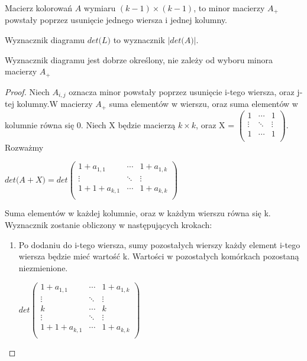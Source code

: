   \begin{definicja}
	Macierz kolorowań $A$ wymiaru $(k-1) \times (k-1)$, to minor macierzy $A_{+}$ powstały poprzez usunięcie jednego wiersza i jednej kolumny.
  \end{definicja}
    \begin{definicja}
    Wyznacznik diagramu $ det \big(L\big)$ to wyznacznik $\vert det \big(A\big) \vert$.
    \end{definicja}
    
\begin{twierdzenie}
Wyznacznik diagramu jest dobrze określony, nie zależy od wyboru minora macierzy $A_{+}$
\end{twierdzenie}

\begin{proof}
Niech $A_{i,j}$ oznacza minor powstały poprzez usunięcie i-tego wiersza, oraz j-tej kolumny.W macierzy $A_{+}$ suma elementów w wierszu, oraz suma elementów w kolumnie równa się 0. Niech X będzie macierzą $k \times k$, oraz X = 
$
\begin{pmatrix}
 1 & \cdots & 1 \\
 \vdots & \ddots & \vdots \\
 1 & \cdots & 1 \\
\end{pmatrix}
$. Rozważmy \\
\begin{center}
 $det\big( A+X \big)=det \begin{pmatrix}
 1+a_{1,1} & \cdots & 1+a_{1,k} \\
 \vdots & \ddots & \vdots \\
 1+1+a_{k,1} & \cdots & 1+a_{k,k} \\
\end{pmatrix}$ \\
\end{center} 
Suma elementów w każdej kolumnie, oraz w każdym wierszu równa się k. Wyznacznik zostanie obliczony w następujących krokach:
\begin{enumerate}
\item Po dodaniu do  i-tego wiersza, sumy pozostałych wierszy każdy element i-tego wiersza będzie mieć wartość k. Wartości w pozostałych komórkach pozostaną niezmienione. \\
\begin{center}

$det \begin{pmatrix}
 1+a_{1,1} & \cdots &  1+a_{1,k} \\
 \vdots & \ddots & \vdots \\
  k & \cdots &  k \\ 
 \vdots & \ddots & \vdots \\
 1+1+a_{k,1} & \cdots & 1+a_{k,k} \\
\end{pmatrix}$ \\
\end{center}


\end{enumerate}
\end{proof}
